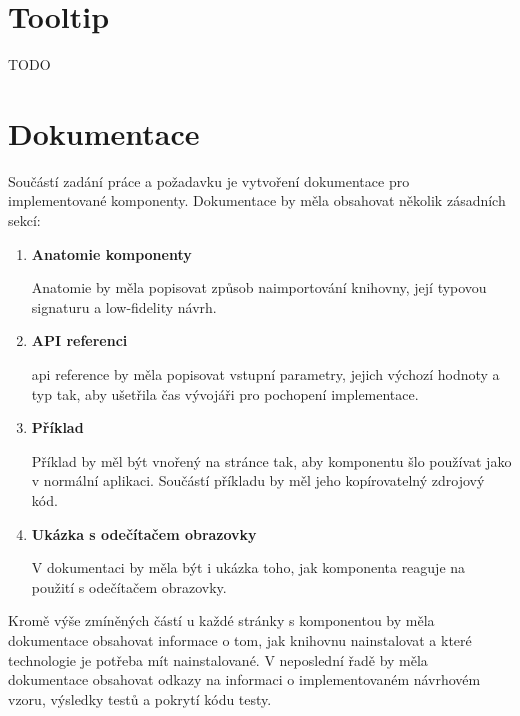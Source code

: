 \section{Tooltip}

TODO

\section{Dokumentace}

Součástí zadání práce a požadavku \hyperref[nfr14]{} je vytvoření dokumentace pro implementované komponenty.
Dokumentace by měla obsahovat několik zásadních sekcí:

\begin{enumerate}
    \item \textbf{Anatomie komponenty}

          Anatomie by měla popisovat způsob naimportování knihovny, její typovou signaturu a low-fidelity návrh.

    \item \textbf{API referenci}

          \gls{api} reference by měla popisovat vstupní parametry, jejich výchozí hodnoty a typ tak, aby ušetřila čas vývojáři pro pochopení implementace.

    \item \textbf{Příklad}

          Příklad by měl být vnořený na stránce tak, aby komponentu šlo používat jako v normální aplikaci. Součástí příkladu by měl jeho kopírovatelný zdrojový kód.

    \item \textbf{Ukázka s odečítačem obrazovky}

          V dokumentaci by měla být i ukázka toho, jak komponenta reaguje na použití s odečítačem obrazovky.

\end{enumerate}

Kromě výše zmíněných částí u každé stránky s komponentou by měla dokumentace obsahovat informace o tom, jak knihovnu nainstalovat a které technologie je potřeba mít nainstalované.
V neposlední řadě by měla dokumentace obsahovat odkazy na informaci o implementovaném návrhovém vzoru, výsledky testů a pokrytí kódu testy.
